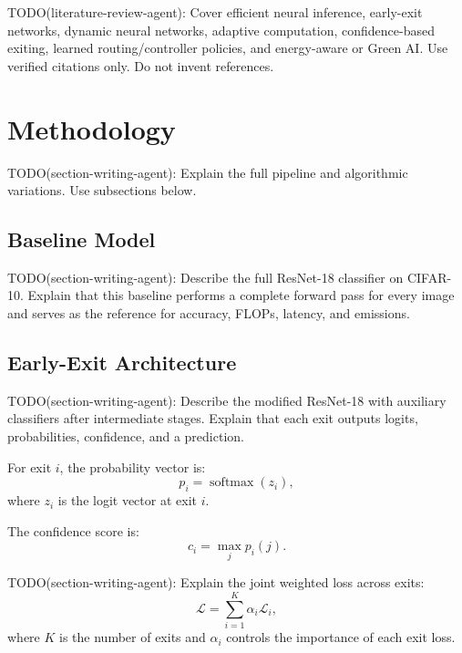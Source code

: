 \documentclass[10pt,twocolumn]{article}
\newcommand{\dataset}{CIFAR-10}
\newcommand{\backbone}{ResNet-18}
\begin{document}
TODO(literature-review-agent): Cover efficient neural inference, early-exit networks, dynamic neural networks, adaptive computation, confidence-based exiting, learned routing/controller policies, and energy-aware or Green AI. Use verified citations only. Do not invent references.

\section{Methodology}

TODO(section-writing-agent): Explain the full pipeline and algorithmic variations. Use subsections below.

\subsection{Baseline Model}

TODO(section-writing-agent): Describe the full \backbone{} classifier on \dataset{}. Explain that this baseline performs a complete forward pass for every image and serves as the reference for accuracy, FLOPs, latency, and emissions.

\subsection{Early-Exit Architecture}

TODO(section-writing-agent): Describe the modified \backbone{} with auxiliary classifiers after intermediate stages. Explain that each exit outputs logits, probabilities, confidence, and a prediction.

For exit $i$, the probability vector is:
\begin{equation}
    p_i = \operatorname{softmax}(z_i),
\end{equation}
where $z_i$ is the logit vector at exit $i$.

The confidence score is:
\begin{equation}
    c_i = \max_j p_i(j).
\end{equation}

TODO(section-writing-agent): Explain the joint weighted loss across exits:
\begin{equation}
    \mathcal{L}
    =
    \sum_{i=1}^{K} \alpha_i \mathcal{L}_i,
\end{equation}
where $K$ is the number of exits and $\alpha_i$ controls the importance of each exit loss.
\end{document}
